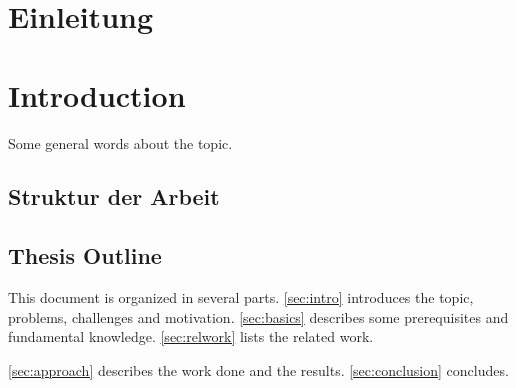 \ifisGerman
    \chapter{Einleitung}
\else
    \chapter{Introduction}
\fi
\label{sec:intro}

Some general words about the topic.


\ifisGerman
    \section{Struktur der Arbeit}
\else
    \section{Thesis Outline}
\fi

This document is organized in several parts.
\autoref{sec:intro} introduces the topic, problems, challenges and motivation.
\autoref{sec:basics} describes some prerequisites and fundamental knowledge.
\autoref{sec:relwork} lists the related work.

\autoref{sec:approach} describes the work done and the results.
\autoref{sec:conclusion} concludes.
